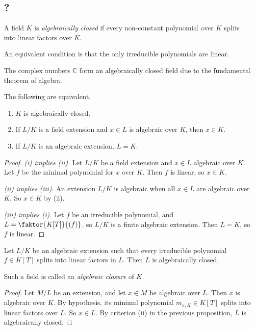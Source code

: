\subsection{?}
\begin{definition}
	A field \( K \) is \emph{algebraically closed} if every non-constant polynomial over \( K \) splits into linear factors over \( K \).
\end{definition}
\begin{remark}
	An equivalent condition is that the only irreducible polynomials are linear.
\end{remark}
\begin{example}
	The complex numbers \( \mathbb C \) form an algebraically closed field due to the fundamental theorem of algebra.
\end{example}
\begin{proposition}
	The following are equivalent.
	\begin{enumerate}
		\item \( K \) is algebraically closed.
		\item If \( L / K \) is a field extension and \( x \in L \) is algebraic over \( K \), then \( x \in K \).
		\item If \( L / K \) is an algebraic extension, \( L = K \).
	\end{enumerate}
\end{proposition}
\begin{proof}
	\emph{(i) implies (ii).}
	Let \( L / K \) be a field extension and \( x \in L \) algebraic over \( K \).
	Let \( f \) be the minimal polynomial for \( x \) over \( K \).
	Then \( f \) is linear, so \( x \in K \).

	\emph{(ii) implies (iii).}
	An extension \( L / K \) is algebraic when all \( x \in L \) are algebraic over \( K \).
	So \( x \in K \) by (ii).

	\emph{(iii) implies (i).}
	Let \( f \) be an irreducible polynomial, and \( L = \faktor{K[T]}{(f)} \), so \( L / K \) is a finite algebraic extension.
	Then \( L = K \), so \( f \) is linear.
\end{proof}
\begin{proposition}
	Let \( L / K \) be an algebraic extension such that every irreducible polynomial \( f \in K[T] \) splits into linear factors in \( L \).
	Then \( L \) is algebraically closed.
\end{proposition}
Such a field is called an \emph{algebraic closure} of \( K \).
\begin{proof}
	Let \( M / L \) be an extension, and let \( x \in M \) be algebraic over \( L \).
	Then \( x \) is algebraic over \( K \).
	By hypothesis, its minimal polynomial \( m_{x,K} \in K[T] \) splits into linear factors over \( L \).
	So \( x \in L \).
	By criterion (ii) in the previous proposition, \( L \) is algebraically closed.
\end{proof}
